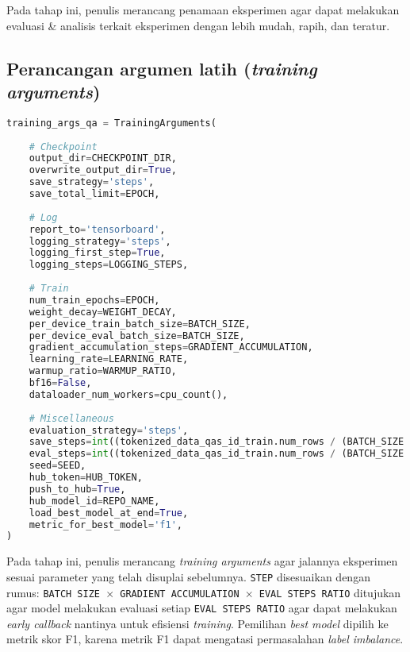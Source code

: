Pada tahap ini, penulis merancang penamaan eksperimen agar dapat melakukan evaluasi \& analisis terkait eksperimen dengan lebih mudah, rapih, dan teratur.

\subsection{Perancangan argumen latih (\emph{training arguments})}
\begin{lstlisting}[language=Python, caption=Perancangan metrik komputasi untuk penilaian \emph{question answering task}]
training_args_qa = TrainingArguments(
        
    # Checkpoint
    output_dir=CHECKPOINT_DIR,
    overwrite_output_dir=True,
    save_strategy='steps',
    save_total_limit=EPOCH,
    
    # Log
    report_to='tensorboard',
    logging_strategy='steps',
    logging_first_step=True,
    logging_steps=LOGGING_STEPS,
    
    # Train
    num_train_epochs=EPOCH,
    weight_decay=WEIGHT_DECAY,
    per_device_train_batch_size=BATCH_SIZE,
    per_device_eval_batch_size=BATCH_SIZE,
    gradient_accumulation_steps=GRADIENT_ACCUMULATION,
    learning_rate=LEARNING_RATE,
    warmup_ratio=WARMUP_RATIO,
    bf16=False,
    dataloader_num_workers=cpu_count(),
    
    # Miscellaneous
    evaluation_strategy='steps',
    save_steps=int((tokenized_data_qas_id_train.num_rows / (BATCH_SIZE * GRADIENT_ACCUMULATION)) * EVAL_STEPS_RATIO),
    eval_steps=int((tokenized_data_qas_id_train.num_rows / (BATCH_SIZE * GRADIENT_ACCUMULATION)) * EVAL_STEPS_RATIO),
    seed=SEED,
    hub_token=HUB_TOKEN,
    push_to_hub=True,
    hub_model_id=REPO_NAME,
    load_best_model_at_end=True,
    metric_for_best_model='f1',
)
\end{lstlisting}

Pada tahap ini, penulis merancang \emph{training arguments} agar jalannya eksperimen sesuai parameter yang telah disuplai sebelumnya. \texttt{STEP} disesuaikan dengan rumus: \texttt{BATCH SIZE $\times$ GRADIENT ACCUMULATION $\times$ EVAL STEPS RATIO} ditujukan agar model melakukan evaluasi setiap \texttt{EVAL STEPS RATIO} agar dapat melakukan \emph{early callback} nantinya untuk efisiensi \emph{training}. Pemilihan \emph{best model} dipilih ke metrik skor F1, karena metrik F1 dapat mengatasi permasalahan \emph{label imbalance}.

